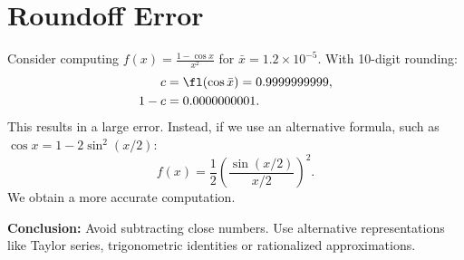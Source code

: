 \section{Roundoff Error} %

Consider computing $f(x) = \frac{1 - \cos x}{x^2}$ for $\bar{x} = 1.2 \times 10^{-5}$.
With 10-digit rounding:
\begin{align*}
    c &= \fl(\cos \bar{x}) = 0.9999999999, \\
    1 - c &= 0.0000000001.
\end{align*}
This results in a large error.
Instead, if we use an alternative formula, such as $\cos x = 1 - 2\sin^2(x/2)$:
\begin{equation*}
    f(x) = \frac{1}{2} \left( \frac{\sin(x/2)}{x/2} \right)^2.
\end{equation*}
We obtain a more accurate computation.

\textbf{Conclusion:} Avoid subtracting close numbers. Use alternative 
representations like Taylor series, trigonometric identities or rationalized 
approximations.

